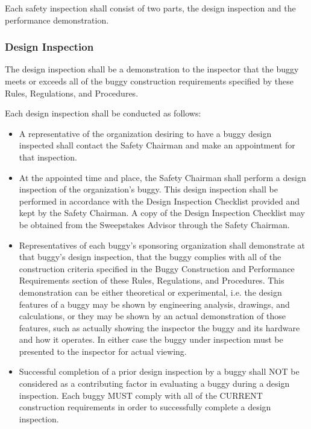 	Each safety inspection shall consist of two parts, the design inspection and
	the performance demonstration.

\subsubsection{Design Inspection}

	The design inspection shall be a demonstration to the inspector that the buggy
	meets or exceeds all of the buggy construction requirements specified by these
	Rules, Regulations, and Procedures.
	\newline

	\noindent Each design inspection shall be conducted as follows:

	\begin{itemize}

		\item
		A representative of the organization desiring to have a buggy design inspected
		shall contact the Safety Chairman and make an appointment for that inspection.

		\item
		At the appointed time and place, the Safety Chairman shall perform a design
		inspection of the organization's buggy. This design inspection shall be
		performed in accordance with the Design Inspection Checklist provided and kept
		by the Safety Chairman. A copy of the Design Inspection Checklist may be
		obtained from the Sweepstakes Advisor through the Safety Chairman.

		\item
		Representatives of each buggy's sponsoring organization shall demonstrate at
		that buggy's design inspection, that the buggy complies with all of the
		construction criteria specified in the Buggy Construction and Performance
		Requirements section of these Rules, Regulations, and Procedures. This
		demonstration can be either theoretical or experimental, i.e. the design
		features of a buggy may be shown by engineering analysis, drawings, and
		calculations, or they may be shown by an actual demonstration of those
		features, such as actually showing the inspector the buggy and its hardware and
		how it operates. In either case the buggy under inspection must be presented to
		the inspector for actual viewing.

		\item
		Successful completion of a prior design inspection by a buggy shall NOT be
		considered as a contributing factor in evaluating a buggy during a design
		inspection. Each buggy MUST comply with all of the CURRENT construction
		requirements in order to successfully complete a design inspection.


\end{itemize}
